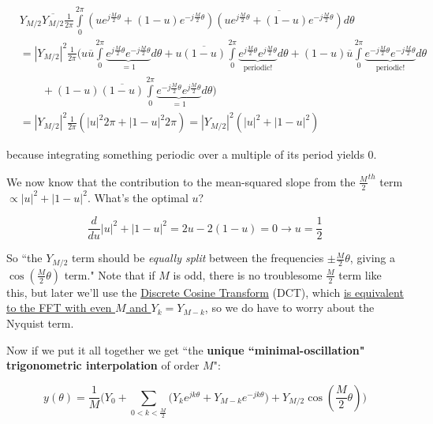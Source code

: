 \documentclass[10pt]{article}
\begin{document}
\begin{align*}
& Y_{M/2}\overline{Y_{M/2}}\frac{1}{2\pi} \int\limits_{0}^{2\pi} (ue^{j\frac{M}{2}\theta} + (1 - u)e^{-j\frac{M}{2}\theta}) \overline{(ue^{j\frac{M}{2}\theta} + (1 - u)e^{-j\frac{M}{2}\theta})} d\theta \\
&= |Y_{M/2}|^2 \frac{1}{2\pi} \Big(u\overline{u} \int\limits_{0}^{2\pi} \underbrace{e^{j\frac{M}{2}\theta} e^{-j\frac{M}{2}\theta}}_{= 1} d\theta + u \overline{(1 - u)} \int\limits_{0}^{2\pi} \underbrace{e^{j\frac{M}{2}\theta} e^{j\frac{M}{2}\theta}}_{\text{periodic!}} d\theta + (1 - u)\overline{u} \int\limits_{0}^{2\pi} \underbrace{e^{-j\frac{M}{2}\theta} e^{-j\frac{M}{2}\theta}}_{\text{periodic!}} d\theta \\
& \quad \quad + (1 - u) \overline{(1 - u)} \int\limits_{0}^{2\pi} \underbrace{e^{-j\frac{M}{2}\theta} e^{j\frac{M}{2}\theta}}_{= 1} d\theta \Big) \\
&= |Y_{M/2}|^2 \frac{1}{2\pi} (|u|^2 2\pi + |1 - u|^2 2\pi) = |Y_{M/2}|^2 (|u|^2 + |1 - u|^2)
\end{align*}

because integrating something periodic over a multiple of its period yields 0.\newline

We now know that the contribution to the mean-squared slope from the $\frac{M}{2}^{th}$ term $\propto |u|^2 + |1 - u|^2$. What's the optimal $u$?

$$\frac{d}{du} |u|^2 + |1 - u|^2 = 2u - 2(1-u) = 0 \longrightarrow u = \frac{1}{2}$$

So ``the $Y_{M/2}$ term should be \textit{equally split} between the frequencies $\pm\frac{M}{2}\theta$, giving a $\cos(\frac{M}{2}\theta)$ term." Note that if $M$ is odd, there is no troublesome $\frac{M}{2}$ term like this, but later we'll use the \href{https://docs.scipy.org/doc/scipy/reference/generated/scipy.fft.dct.html}{Discrete Cosine Transform}\cite{dct} (DCT), which \hyperref[fftdct]{is equivalent to the FFT with even $M$ and $Y_k = Y_{M-k}$}, so we do have to worry about the Nyquist term.

Now if we put it all together we get ``the \textbf{unique ``minimal-oscillation" trigonometric interpolation} of order $M$":

\begin{equation}\label{interpolant}
y(\theta) = \frac{1}{M} \Big(Y_0 + \sum_{0 < k < \frac{M}{2}} \big(Y_k e^{j k \theta} + Y_{M-k} e^{-j k \theta}\big) + Y_{M/2}\cos(\frac{M}{2}\theta) \Big)
\end{equation}
\end{document}

